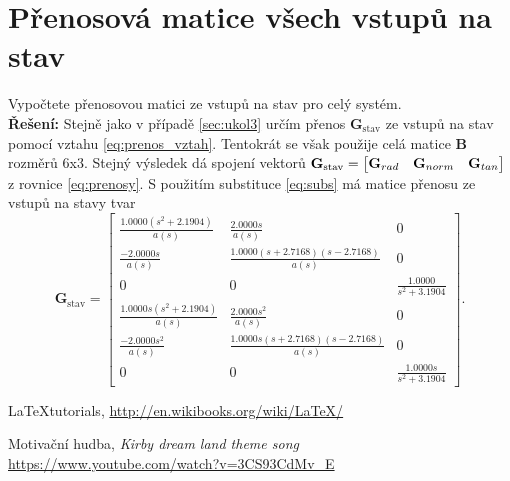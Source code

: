 \documentclass[twoside]{article}
\begin{document}
\section{Přenosová matice všech vstupů na stav}
\label{sec:ukol5}
Vypočtete přenosovou matici ze vstupů na stav pro celý systém.\\
\textbf{Řešení:}
Stejně jako v případě \ref{sec:ukol3} určím přenos $\mathbf{G}_{\text{stav}}$ ze vstupů na stav pomocí vztahu \eqref{eq:prenos_vztah}.
Tentokrát se však použije celá matice $\mathbf{B}$ rozměrů 6x3. Stejný výsledek dá spojení vektorů $\mathbf{G}_{\text{stav}} = 
\begin{bmatrix} \mathbf{G}_{rad} & \mathbf{G}_{norm} & \mathbf{G}_{tan} \end{bmatrix}$ z rovnice \eqref{eq:prenosy}.
S použitím substituce \eqref{eq:subs} má matice přenosu ze vstupů na stavy tvar
\begin{equation*}
	\mathbf{G}_\text{stav} = \begin{bmatrix}
	\frac{1.0000(s^2+2.1904)     }{a(s)} 	&\frac{2.0000s}{a(s)}                     & 0                             \\
	\frac{-2.0000s        }{a(s)}        	&\frac{1.0000(s+2.7168)(s-2.7168) }{a(s)} & 0                             \\
	0                                    	&0                                        & \frac{1.0000}{s^2+3.1904}     \\
	\frac{1.0000s(s^2+2.1904)}{a(s)}     	&\frac{2.0000s^2                  }{a(s)} & 0                             \\
	\frac{-2.0000s^2}{a(s)}              	&\frac{1.0000s(s+2.7168)(s-2.7168)}{a(s)} & 0                             \\
	0                                    	&0                                        & \frac{1.0000s}{s^2+3.1904}    
	\end{bmatrix}.
\end{equation*}


\begin{thebibliography}{9}


	\LaTeX tutorials, \url{http://en.wikibooks.org/wiki/LaTeX/}

	Motivační hudba, \emph{Kirby dream land theme song} \url{https://www.youtube.com/watch?v=3CS93CdMv_E}

\end{thebibliography}
\end{document}
